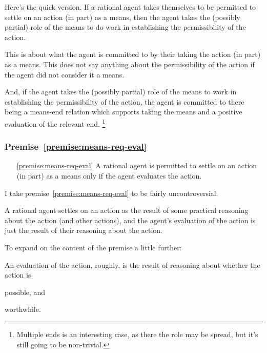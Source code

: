 \documentclass[10pt]{article}
\newcommand{\hozlinedash}[0]{%
  \noindent\hdashrule[0.5ex][c]{\textwidth}{.1pt}{2.5pt}
}
\begin{document}
\hozlinedash

Here's the quick version.
If a rational agent takes themselves to be permitted to settle on an action (in part) as a means, then the agent takes the (possibly partial) role of the means to do work in establishing the permissibility of the action.

This is about what the agent is committed to by their taking the action (in part) as a means.
This does not say anything about the permissibility of the action if the agent did not consider it a means.

And, if the agent takes the (possibly partial) role of the means to work in establishing the permissibility of the action, the agent is committed to there being a means-end relation which supports taking the means and a positive evaluation of the relevant end.\nolinebreak
\footnote{Multiple ends is an interesting case, as there the role may be spread, but it's still going to be non-trivial.}

\newpage

\subsubsection{Premise~\ref{premise:means-req-eval}}


\begin{enumerate}
\item[\ref{premise:means-req-eval}] A rational agent is permitted to settle on an action (in part) as a means only if the agent evaluates the action.
\end{enumerate}

I take premise~\ref{premise:means-req-eval} to be fairly uncontroversial.

A rational agent settles on an action as the result of some practical reasoning about the action (and other actions), and the agent's evaluation of the action is just the result of their reasoning about the action.

To expand on the content of the premise a little further:

An evaluation of the action, roughly, is the result of reasoning about whether the action is
\begin{enumerate*}[label=\alph*)]
\item possible, and
\item worthwhile.
\end{enumerate*}
\end{document}
